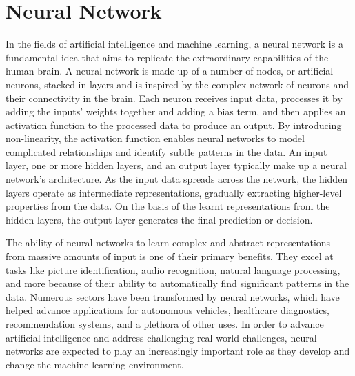 \documentclass[a4paper,11pt]{report}%
\renewcommand{\\}{\vspace*{0.5\baselineskip} \newline}
\begin{document}
\section{Neural Network}
In the fields of artificial intelligence and machine learning, a neural network is a fundamental idea that aims to replicate the extraordinary capabilities of the human brain. A neural network is made up of a number of nodes, or artificial neurons, stacked in layers and is inspired by the complex network of neurons and their connectivity in the brain. Each neuron receives input data, processes it by adding the inputs' weights together and adding a bias term, and then applies an activation function to the processed data to produce an output. By introducing non-linearity, the activation function enables neural networks to model complicated relationships and identify subtle patterns in the data.
An input layer, one or more hidden layers, and an output layer typically make up a neural network's architecture. As the input data spreads across the network, the hidden layers operate as intermediate representations, gradually extracting higher-level properties from the data. On the basis of the learnt representations from the hidden layers, the output layer generates the final prediction or decision.

\noindent The ability of neural networks to learn complex and abstract representations from massive amounts of input is one of their primary benefits. They excel at tasks like picture identification, audio recognition, natural language processing, and more because of their ability to automatically find significant patterns in the data. Numerous sectors have been transformed by neural networks, which have helped advance applications for autonomous vehicles, healthcare diagnostics, recommendation systems, and a plethora of other uses.
In order to advance artificial intelligence and address challenging real-world challenges, neural networks are expected to play an increasingly important role as they develop and change the machine learning environment.
\end{document}
